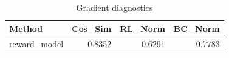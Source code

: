 \begin{table}[htbp]
\centering
\caption{Gradient diagnostics}
\label{tab:grad-diag}
\begin{tabular}{lrrr}
\toprule
\textbf{Method} & \textbf{Cos\_Sim} & \textbf{RL\_Norm} & \textbf{BC\_Norm} \\
\midrule
reward\_model & 0.8352 & 0.6291 & 0.7783 \\
\bottomrule
\end{tabular}
\end{table}